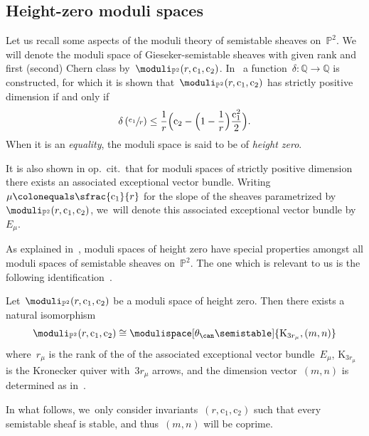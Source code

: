 \subsection{Height-zero moduli spaces}
\label{subsection:height-zero}
Let us recall some aspects of the moduli theory of semistable sheaves on~$\mathbb{P}^2$.
We will denote
the moduli space of Gieseker-semistable sheaves with given rank and first (\resp second) Chern class
by~$\moduli_{\mathbb{P}^2}(r,\mathrm{c}_1,\mathrm{c}_2)$.
In~\cite{MR0916199} a function~$\delta\colon\mathbb{Q}\to\mathbb{Q}$ is constructed,
for which it is shown that~$\moduli_{\mathbb{P}^2}(r,\mathrm{c}_1,\mathrm{c}_2)$ has strictly positive dimension
if and only if
\begin{equation*}
\delta\left( \sfrac{\mathrm{c}_1}{r} \right)
\leq
\frac{1}{r}\Bigl( \mathrm{c}_2 - \Bigl( 1-\frac{1}{r} \Bigr)\frac{\mathrm{c}_1^2}{2} \Bigr).
\end{equation*}
When it is an \emph{equality},
the moduli space is said to be of \emph{height zero}.

It is also shown in op.~cit.~that for moduli spaces of strictly positive dimension
there exists an associated exceptional vector bundle.
Writing~$\mu\colonequals\sfrac{\mathrm{c}_1}{r}$ for the slope of the sheaves parametrized by~$\moduli_{\mathbb{P}^2}(r,\mathrm{c}_1,\mathrm{c}_2)$, we~will denote this associated exceptional vector bundle by~$E_\mu$.

As explained in~\cite{MR0916199},
moduli spaces of height zero have special properties
amongst all moduli spaces of semistable sheaves on~$\mathbb{P}^2$.
The one which is relevant to us is the following identification~\cite[Th.\,2]{MR0916199}.

\begin{theorem}[Drezet]
\label{theorem:identification}
Let~$\moduli_{\mathbb{P}^2}(r,\mathrm{c}_1,\mathrm{c}_2)$ be a moduli space of height zero.
Then there exists a natural isomorphism
\begin{equation*}
\moduli_{\mathbb{P}^2}(r,\mathrm{c}_1,\mathrm{c}_2)
\cong
\modulispace[\theta_\can\semistable]{\mathrm{K}_{3r_\mu},(m,n)}
\end{equation*}
where~$r_\mu$ is the rank of the of the associated exceptional vector bundle~$E_\mu$,
$\mathrm{K}_{3r_\mu}$ is the Kronecker quiver with~$3r_\mu$ arrows,
and the dimension vector~$(m,n)$ is determined as in~\cite[\S IV.2]{MR0916199}.
\end{theorem}

In what follows, we~only consider invariants~$(r,\mathrm{c}_1,\mathrm{c}_2)$
such that every semistable sheaf is stable,
and thus~$(m,n)$ will be coprime.

